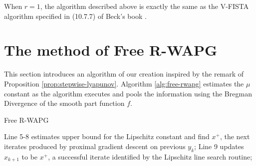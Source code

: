 \documentclass[12pt]{article}
\begin{document}
        \begin{remark}
            When $r = 1$, the algorithm described above is exactly the same as the V-FISTA algorithm specified in (10.7.7) of Beck's book \cite{beck_first-order_2017}. 
        \end{remark}


    
\section{The method of Free R-WAPG}\label{sec:free-rwapg}
    This section introduces an algorithm of our creation inspired by the remark of Proposition \ref{prop:stepwise-lyapunov}. 
    Algorithm \ref{alg:free-rwapg} estimates the $\mu$ constant as the algorithm executes and pools the information using the Bregman Divergence of the smooth part function $f$. 
    \begin{algorithm}
        \begin{algorithmic}[1]
        {\footnotesize
            \ENDWHILE
        \ENDFOR
        }
        \end{algorithmic}
        \caption{Free R-WAPG}
        \label{alg:free-rwapg}
    \end{algorithm}
    \par
    Line 5-8 estimates upper bound for the Lipschitz constant and find $x^+$, the next iterates produced by proximal gradient descent on previous $y_k$; 
    Line 9 updates $x_{k + 1}$ to be $x^+$, a successful iterate identified by the Lipschitz line search routine;
\end{document}
